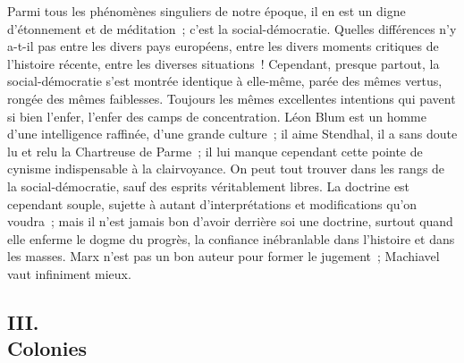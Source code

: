 \documentclass[french,twoside]{book} %
\begin{document}
Parmi tous les phénomènes singuliers de notre époque, il en est un digne d'étonnement et de méditation ; c'est la social-démocratie. Quelles différences n'y a-t-il pas entre les divers pays européens, entre les divers moments critiques de l'histoire récente, entre les diverses situations ! Cependant, pres­que partout, la social-démocratie s'est montrée identique à elle-même, parée des mêmes vertus, rongée des mêmes faiblesses. Toujours les mêmes excel­lentes intentions qui pavent si bien l'enfer, l'enfer des camps de concentration. Léon Blum est un homme d'une intelligence raffinée, d'une grande culture ; il aime Stendhal, il a sans doute lu et relu la Chartreuse de Parme ; il lui manque cependant cette pointe de cynisme indispensable à la clairvoyance. On peut tout trouver dans les rangs de la social-démocratie, sauf des esprits véritable­ment libres. La doctrine est cependant souple, sujette à autant d'interprétations et modifications qu'on voudra ; mais il n'est jamais bon d'avoir derrière soi une doctrine, surtout quand elle enferme le dogme du progrès, la confiance inébranlable dans l'histoire et dans les masses. Marx n'est pas un bon auteur pour former le jugement ; Machiavel vaut infiniment mieux.\par

\begin{center}
\noindent \centerline{}
\end{center}

\subsection[{III. Colonies}]{III. \\
Colonies}
\end{document}
